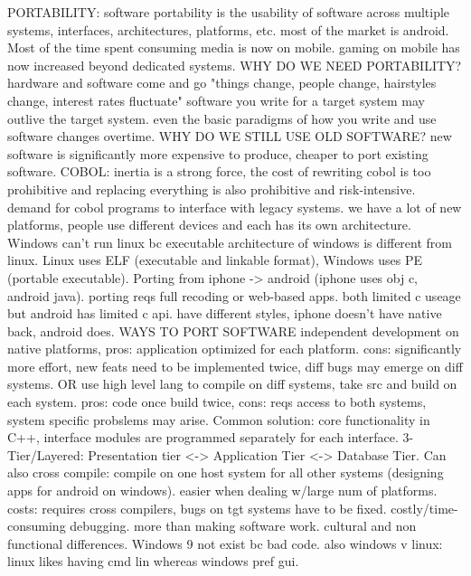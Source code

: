 \documentclass[10pt]{article}
\begin{document}
\begin{landscape}
\begin{multicols*}{6}
PORTABILITY:
software portability is the usability of software across multiple systems, interfaces, architectures, platforms, etc. most of the market is android. Most of the time spent consuming media is now on mobile. gaming on mobile has now increased beyond dedicated systems. WHY DO WE NEED PORTABILITY? hardware and software come and go "things change, people change, hairstyles change, interest rates fluctuate" software you write for a target system may outlive the target system. even the basic paradigms of how you write and use software changes overtime. WHY DO WE STILL USE OLD SOFTWARE? new software is significantly more expensive to produce, cheaper to port existing software. COBOL: inertia is a strong force, the cost of rewriting cobol is too prohibitive and replacing everything is also prohibitive and risk-intensive. demand for cobol programs to interface with legacy systems. we have a lot of new platforms, people use different devices and each has its own architecture. Windows can't run linux bc executable architecture of windows is different from linux. Linux uses ELF (executable and linkable format), Windows uses PE (portable executable). Porting from iphone -> android (iphone uses obj c, android java). porting reqs full recoding or web-based apps. both limited c useage but android has limited c api. have different styles, iphone doesn't have native back, android does. WAYS TO PORT SOFTWARE independent development on native platforms, pros: application optimized for each platform. cons: significantly more effort, new feats need to be implemented twice, diff bugs may emerge on diff systems. OR use high level lang to compile on diff systems, take src and build on each system. pros: code once build twice, cons: reqs access to both systems, system specific probslems may arise. Common solution: core functionality in C++, interface modules are programmed separately for each interface. 3-Tier/Layered: Presentation tier <-> Application Tier <-> Database Tier. Can also cross compile: compile on one host system for all other systems (designing apps for android on windows). easier when dealing w/large num of platforms. costs: requires cross compilers, bugs on tgt systems have to be fixed. costly/time-consuming debugging. more than making software work. cultural and non functional differences. Windows 9 not exist bc bad code. also windows v linux: linux likes having cmd lin whereas windows pref gui.


\end{multicols*}
\end{landscape}
\end{document}
